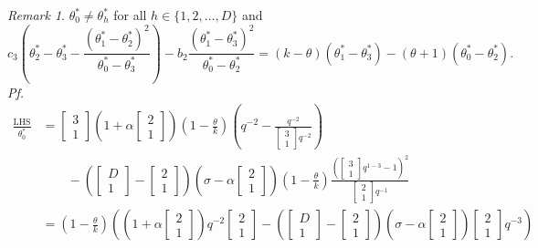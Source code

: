 \documentclass[
]{book}
\theoremstyle{definition}
\theoremstyle{definition}
\theoremstyle{definition}
\theoremstyle{definition}
\theoremstyle{remark}
\newtheorem*{remark}{Remark}
\begin{document}
\begin{remark}
\(\theta^*_0\neq \theta^*_h\) for all \(h\in \{1,2,\ldots, D\}\) and
\[c_3\left(\theta^*_2 - \theta^*_3 - \frac{(\theta^*_1-\theta^*_{2})^2}{\theta^*_0-\theta^*_3}\right) - b_{2} \frac{(\theta^*_1-\theta^*_{3})^2}{\theta^*_0-\theta^*_{2}} = (k-\theta)(\theta^*_1-\theta^*_3)-(\theta+1)(\theta^*_0-\theta^*_2).\]
\emph{Pf.}
\begin{align}
\frac{\mathrm{LHS}}{\theta^*_0} & = \begin{bmatrix}{3}\\{1}\end{bmatrix}\left(1+\alpha \begin{bmatrix}{2}\\{1}\end{bmatrix}\right)\left(1-\frac{\theta}{k}\right)\left(q^{-2} - \frac{q^{-2}}{\begin{bmatrix}{3}\\{1}\end{bmatrix}q^{-2}}\right)\\
& \qquad -\left(\begin{bmatrix}{D}\\{1}\end{bmatrix}-\begin{bmatrix}{2}\\{1}\end{bmatrix}\right)\left(\sigma-\alpha \begin{bmatrix}{2}\\{1}\end{bmatrix}\right)\left(1-\frac{\theta}{k}\right)\frac{\left(\begin{bmatrix}{3}\\{1}\end{bmatrix}q^{1-3}-1\right)^2}{\begin{bmatrix}{2}\\{1}\end{bmatrix}q^{-1}}\\
& = \left(1-\frac{\theta}{k}\right)\left(\left(1+\alpha\begin{bmatrix}{2}\\{1}\end{bmatrix}\right)q^{-2}\begin{bmatrix}{2}\\{1}\end{bmatrix}-\left(\begin{bmatrix}{D}\\{1}\end{bmatrix}-\begin{bmatrix}{2}\\{1}\end{bmatrix}\right)\left(\sigma-\alpha\begin{bmatrix}{2}\\{1}\end{bmatrix}\right)\begin{bmatrix}{2}\\{1}\end{bmatrix}q^{-3}\right)\\

\end{align}
\end{remark}
\end{document}
